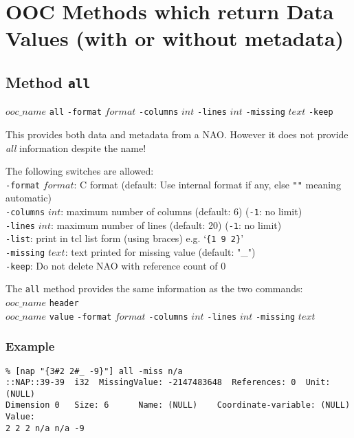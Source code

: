 
\section{OOC Methods which return Data Values (with or without metadata)}
    \label{ooc-data}

\subsection{Method \texttt{all}}
    \label{ooc-data-all}

  $ooc\_name$ 
  \texttt{all} 
  \texttt{-format} 
  $format$ 
  \texttt{-columns} 
  $int$ 
  \texttt{-lines} 
  $int$ 
  \texttt{-missing} 
  $text$ 
  \texttt{-keep}

This provides both data and metadata from a NAO. However it does
  not provide 
  \emph{all} information despite the name!

The following switches are allowed:
  \\
  \texttt{-format} 
  $format$: C format (default: Use internal format if any,
  else \texttt{""} meaning automatic)
  \\
  \texttt{-columns} 
  $int$: maximum number of columns (default: 6) (\texttt{-1}: no limit)
  \\
  \texttt{-lines} 
  $int$: maximum number of lines (default: 20) (\texttt{-1}: no limit)
  \\
  \texttt{-list}: print in tcl list form (using braces) e.g. `\texttt{\{1 9 2\}}'
  \\
  \texttt{-missing} 
  $text$: text printed for missing value (default:
  "\_")
  \\
  \texttt{-keep}: Do not delete NAO with reference count of 0
  

The 
  \texttt{all} method provides the same information as the two
  commands:
  \\
  $ooc\_name$ 
  \texttt{header}
  \\
  $ooc\_name$ 
  \texttt{value} 
  \texttt{-format} 
  $format$ 
  \texttt{-columns} 
  $int$ 
  \texttt{-lines} 
  $int$ 
  \texttt{-missing} 
  $text$

\subsubsection{Example}

  \begin{verbatim}
% [nap "{3#2 2#_ -9}"] all -miss n/a
::NAP::39-39  i32  MissingValue: -2147483648  References: 0  Unit: (NULL)
Dimension 0   Size: 6      Name: (NULL)    Coordinate-variable: (NULL)
Value:
2 2 2 n/a n/a -9
\end{verbatim}

